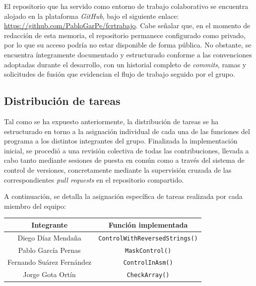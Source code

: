 \documentclass[11pt,a4paper]{article}
\begin{document}
\noindent El repositorio que ha servido como entorno de trabajo colaborativo se encuentra alojado en la plataforma \textit{GitHub}, bajo el siguiente enlace: \href{https://github.com/PabloGarPe/fcrtrabajo}{https://github.com/PabloGarPe/fcrtrabajo}. Cabe señalar que, en el momento de redacción de esta memoria, el repositorio permanece configurado como privado, por lo que su acceso podría no estar disponible de forma pública. No obstante, se encuentra íntegramente documentado y estructurado conforme a las convenciones adoptadas durante el desarrollo, con un historial completo de \textit{commits}, ramas y solicitudes de fusión que evidencian el flujo de trabajo seguido por el grupo. \vspace{3ex}

\subsection{Distribución de tareas}
Tal como se ha expuesto anteriormente, la distribución de tareas se ha estructurado en torno a la asignación individual de cada una de las funciones del programa a los distintos integrantes del grupo. Finalizada la implementación inicial, se procedió a una revisión colectiva de todas las contribuciones, llevada a cabo tanto mediante sesiones de puesta en común como a través del sistema de control de versiones, concretamente mediante la supervisión cruzada de las correspondientes \textit{pull requests} en el repositorio compartido. \vspace{2ex}

\noindent A continuación, se detalla la asignación específica de tareas realizada por cada miembro del equipo: \vspace{1ex}
\begin{center}
  \renewcommand{\arraystretch}{1.2}
  \begin{tabular}{|c|c|}
    \hline
    \textbf{Integrante}\cellcolor{azulSuave} & \textbf{Función implementada}\cellcolor{azulSuave} \\
    \hline
    Diego Díaz Mendaña & \texttt{ControlWithReversedStrings()} \\
    Pablo García Pernas & \texttt{MaskControl()} \\
    Fernando Suárez Fernández & \texttt{ControlInAsm()} \\
    Jorge Gota Ortín & \texttt{CheckArray()} \\
    \hline
  \end{tabular}
\end{center}
\vspace{3ex}
\end{document}
